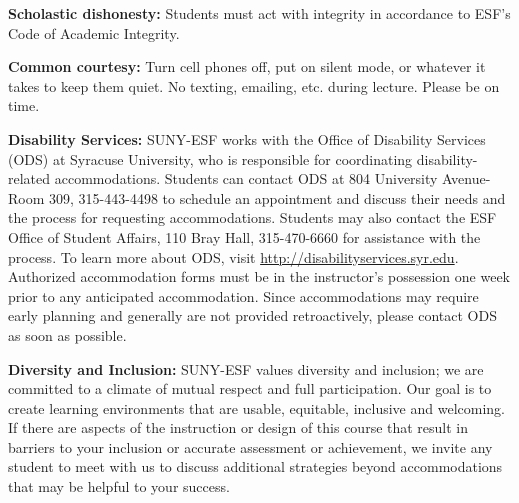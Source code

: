 \documentclass[
  letterpaper,
  DIV=11,
  numbers=noendperiod]{scrartcl}
\begin{document}
\textbf{Scholastic dishonesty:} Students must act with integrity in
accordance to ESF's Code of Academic Integrity.

\textbf{Common courtesy:} Turn cell phones off, put on silent mode, or
whatever it takes to keep them quiet. No texting, emailing, etc. during
lecture. Please be on time.

\textbf{Disability Services:} SUNY-ESF works with the Office of
Disability Services (ODS) at Syracuse University, who is responsible for
coordinating disability-related accommodations. Students can contact ODS
at 804 University Avenue-Room 309, 315-443-4498 to schedule an
appointment and discuss their needs and the process for requesting
accommodations. Students may also contact the ESF Office of Student
Affairs, 110 Bray Hall, 315-470-6660 for assistance with the process. To
learn more about ODS, visit \url{http://disabilityservices.syr.edu}.
Authorized accommodation forms must be in the instructor's possession
one week prior to any anticipated accommodation. Since accommodations
may require early planning and generally are not provided retroactively,
please contact ODS as soon as possible.

\textbf{Diversity and Inclusion:} SUNY-ESF values diversity and
inclusion; we are committed to a climate of mutual respect and full
participation. Our goal is to create learning environments that are
usable, equitable, inclusive and welcoming. If there are aspects of the
instruction or design of this course that result in barriers to your
inclusion or accurate assessment or achievement, we invite any student
to meet with us to discuss additional strategies beyond accommodations
that may be helpful to your success.
\end{document}

